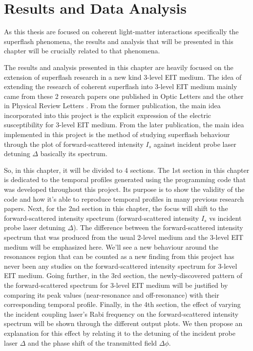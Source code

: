 \chapter{Results and Data Analysis}\label{results and analysis}
As this thesis are focused on coherent light-matter interactions specifically the superflash phenomena, the results and analysis that will be presented in this chapter will be crucially related to that phenomena.

The results and analysis presented in this chapter are heavily focused on the extension of superflash research in a new kind 3-level EIT medium. The idea of extending the research of coherent superflash into 3-level EIT medium mainly came from these 2 research papers one published in Optic Letters \cite{jeong2010slow} and the other in Physical Review Letters \cite{Kwong2014}. From the former publication, the main idea incorporated into this project is the explicit expression of the electric susceptibility for 3-level EIT medium. From the later publication, the main idea implemented in this project is the method of studying superflash behaviour through the plot of forward-scattered intensity $I_{s}$ against incident probe laser detuning $\Delta$ basically its spectrum.

So, in this chapter, it will be divided to 4 sections. The 1st section in this chapter is dedicated to the temporal profiles generated using the programming code that was developed throughout this project. Its purpose is to show the validity of the code and how it's able to reproduce temporal profiles in many previous research papers. Next, for the 2nd section in this chapter, the focus will shift to the forward-scattered intensity spectrum (forward-scattered intensity $I_{s}$ vs incident probe laser detuning $\Delta$). The difference between the forward-scattered intensity spectrum that was produced from the usual 2-level medium and the 3-level EIT medium will be emphasized here. We'll see a new behaviour around the resonances region that can be counted as a new finding from this project has never been any studies on the forward-scattered intensity spectrum for 3-level EIT medium. Going further, in the 3rd section, the newly-discovered pattern of the forward-scattered spectrum for 3-level EIT medium will be justified by comparing its peak values (near-resonance and off-resonance) with their corresponding temporal profile. Finally, in the 4th section, the effect of varying the incident coupling laser's Rabi frequency on the forward-scattered intensity spectrum will be shown through the different output plots. We then propose an explanation for this effect by relating it to the detuning of the incident probe laser $\Delta$ and the phase shift of the transmitted field $\Delta\phi$.


